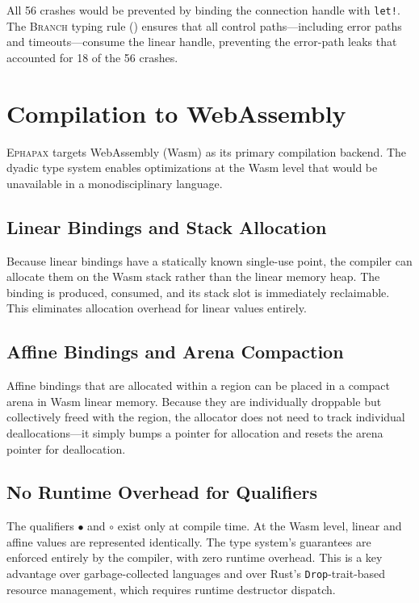 \documentclass[11pt,a4paper]{article}
\newcommand{\Ephapax}{\textsc{Ephapax}}
\newcommand{\lmark}{\bullet}  %
\newcommand{\amark}{\circ}    %
\begin{document}
All 56 crashes would be prevented by binding the connection handle with
\lstinline{let!}. The \textsc{Branch} typing rule ()
ensures that all control paths---including error paths and timeouts---consume
the linear handle, preventing the error-path leaks that accounted for 18 of the
56 crashes.

\section{Compilation to WebAssembly}
\label{sec:wasm}

\Ephapax{} targets WebAssembly (Wasm) as its primary compilation backend. The
dyadic type system enables optimizations at the Wasm level that would be
unavailable in a monodisciplinary language.

\subsection{Linear Bindings and Stack Allocation}

Because linear bindings have a statically known single-use point, the compiler
can allocate them on the Wasm stack rather than the linear memory heap.
The binding is produced, consumed, and its stack slot is immediately
reclaimable. This eliminates allocation overhead for linear values entirely.

\subsection{Affine Bindings and Arena Compaction}

Affine bindings that are allocated within a region can be placed in a compact
arena in Wasm linear memory. Because they are individually droppable but
collectively freed with the region, the allocator does not need to track
individual deallocations---it simply bumps a pointer for allocation and resets
the arena pointer for deallocation.

\subsection{No Runtime Overhead for Qualifiers}

The qualifiers $\lmark$ and $\amark$ exist only at compile time. At the Wasm
level, linear and affine values are represented identically. The type system's
guarantees are enforced entirely by the compiler, with zero runtime overhead.
This is a key advantage over garbage-collected languages and over Rust's
\lstinline{Drop}-trait-based resource management, which requires runtime
destructor dispatch.
\end{document}
